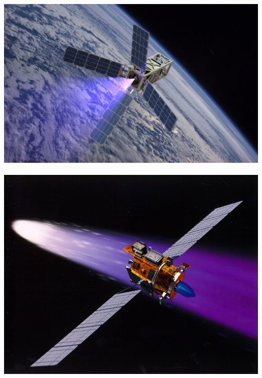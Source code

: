 \begin{frame}
\begin{center}
    \includegraphics[height=0.5\textheight]{figures/patriot_plume.jpg}
    ~
    \includegraphics[height=0.5\textheight]{figures/deepspace1.jpg}
\end{center}
\end{frame}   %

